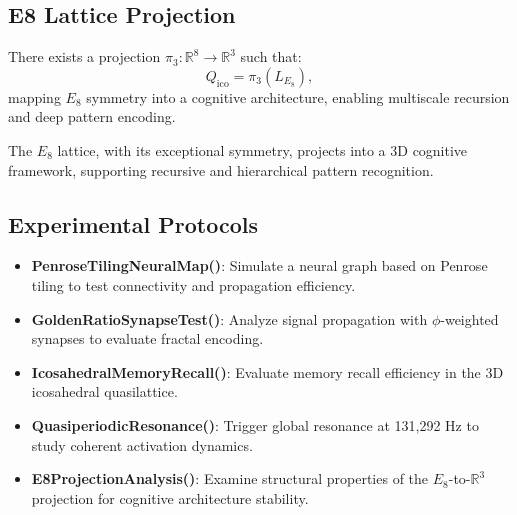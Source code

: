 \documentclass[12pt]{article}
\begin{document}
\subsection{E8 Lattice Projection}
\begin{corollary}
There exists a projection \( \pi_3: \mathbb{R}^8 \to \mathbb{R}^3 \) such that:
\[
Q_{\text{ico}} = \pi_3(L_{E_8}),
\]
mapping \( E_8 \) symmetry into a cognitive architecture, enabling multiscale recursion and deep pattern encoding.
\end{corollary}
\begin{interpretation}
The \( E_8 \) lattice, with its exceptional symmetry, projects into a 3D cognitive framework, supporting recursive and hierarchical pattern recognition.
\end{interpretation}

\subsection{Experimental Protocols}
\begin{itemize}
    \item \textbf{PenroseTilingNeuralMap()}: Simulate a neural graph based on Penrose tiling to test connectivity and propagation efficiency.
    \item \textbf{GoldenRatioSynapseTest()}: Analyze signal propagation with \( \phi \)-weighted synapses to evaluate fractal encoding.
    \item \textbf{IcosahedralMemoryRecall()}: Evaluate memory recall efficiency in the 3D icosahedral quasilattice.
    \item \textbf{QuasiperiodicResonance()}: Trigger global resonance at 131,292 Hz to study coherent activation dynamics.
    \item \textbf{E8ProjectionAnalysis()}: Examine structural properties of the \( E_8 \)-to-\( \mathbb{R}^3 \) projection for cognitive architecture stability.
\end{itemize}
\end{document}
